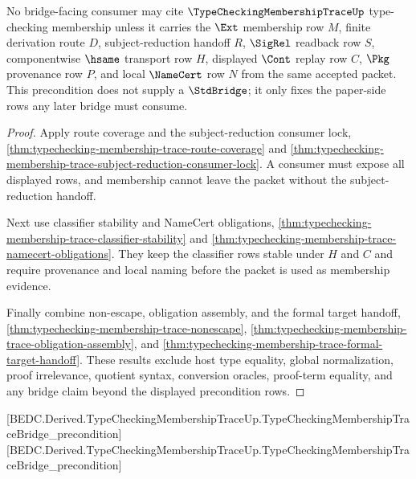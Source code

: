 \begin{theorem}
\label{thm:typechecking-membership-trace-bridge-precondition}
No bridge-facing consumer may cite $\TypeCheckingMembershipTraceUp$ type-checking membership unless it carries the $\Ext$ membership row $M$, finite derivation route $D$, subject-reduction handoff $R$, $\SigRel$ readback row $S$, componentwise $\hsame$ transport row $H$, displayed $\Cont$ replay row $C$, $\Pkg$ provenance row $P$, and local $\NameCert$ row $N$ from the same accepted packet. This precondition does not supply a $\StdBridge$; it only fixes the paper-side rows any later bridge must consume.
\end{theorem}
\begin{proof}
Apply route coverage and the subject-reduction consumer lock, \autoref{thm:typechecking-membership-trace-route-coverage} and \autoref{thm:typechecking-membership-trace-subject-reduction-consumer-lock}. A consumer must expose all displayed rows, and membership cannot leave the packet without the subject-reduction handoff.

Next use classifier stability and NameCert obligations, \autoref{thm:typechecking-membership-trace-classifier-stability} and \autoref{thm:typechecking-membership-trace-namecert-obligations}. They keep the classifier rows stable under $H$ and $C$ and require provenance and local naming before the packet is used as membership evidence.

Finally combine non-escape, obligation assembly, and the formal target handoff, \autoref{thm:typechecking-membership-trace-nonescape}, \autoref{thm:typechecking-membership-trace-obligation-assembly}, and \autoref{thm:typechecking-membership-trace-formal-target-handoff}. These results exclude host type equality, global normalization, proof irrelevance, quotient syntax, conversion oracles, proof-term equality, and any bridge claim beyond the displayed precondition rows.
\end{proof}

[BEDC.Derived.TypeCheckingMembershipTraceUp.TypeCheckingMembershipTraceBridge\_precondition]
[BEDC.Derived.TypeCheckingMembershipTraceUp.TypeCheckingMembershipTraceBridge\_precondition]

